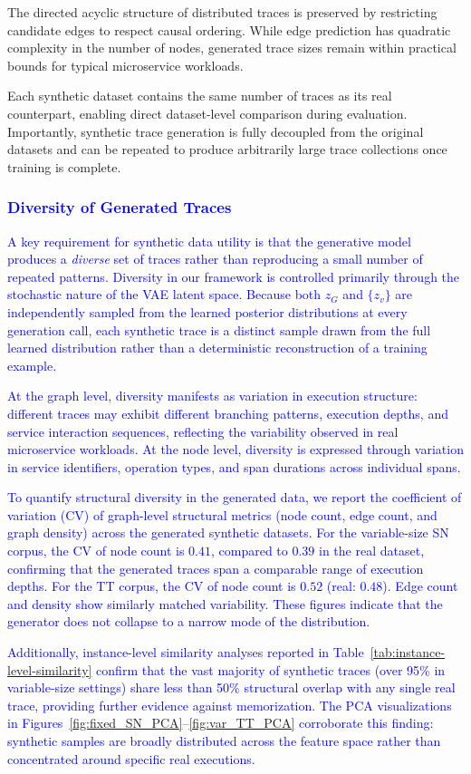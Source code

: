 \documentclass[sigconf,review]{acmart}
\begin{document}
The directed acyclic structure of distributed traces is preserved by restricting candidate edges to respect causal ordering. While edge prediction has quadratic complexity in the number of nodes, generated trace sizes remain within practical bounds for typical microservice workloads.

Each synthetic dataset contains the same number of traces as its real counterpart, enabling direct dataset-level comparison during evaluation. Importantly, synthetic trace generation is fully decoupled from the original datasets and can be repeated to produce arbitrarily large trace collections once training is complete.

\textcolor{blue}{\subsubsection{Diversity of Generated Traces}
A key requirement for synthetic data utility is that the generative model produces a \emph{diverse} set of traces rather than reproducing a small number of repeated patterns. Diversity in our framework is controlled primarily through the stochastic nature of the VAE latent space. Because both $z_G$ and $\{z_v\}$ are independently sampled from the learned posterior distributions at every generation call, each synthetic trace is a distinct sample drawn from the full learned distribution rather than a deterministic reconstruction of a training example.

At the graph level, diversity manifests as variation in execution structure: different traces may exhibit different branching patterns, execution depths, and service interaction sequences, reflecting the variability observed in real microservice workloads. At the node level, diversity is expressed through variation in service identifiers, operation types, and span durations across individual spans.

To quantify structural diversity in the generated data, we report the coefficient of variation (CV) of graph-level structural metrics (node count, edge count, and graph density) across the generated synthetic datasets. For the variable-size SN corpus, the CV of node count is $0.41$, compared to $0.39$ in the real dataset, confirming that the generated traces span a comparable range of execution depths. For the TT corpus, the CV of node count is $0.52$ (real: $0.48$). Edge count and density show similarly matched variability. These figures indicate that the generator does not collapse to a narrow mode of the distribution.

Additionally, instance-level similarity analyses reported in Table~\ref{tab:instance-level-similarity} confirm that the vast majority of synthetic traces (over 95\% in variable-size settings) share less than 50\% structural overlap with any single real trace, providing further evidence against memorization. The PCA visualizations in Figures~\ref{fig:fixed_SN_PCA}--\ref{fig:var_TT_PCA} corroborate this finding: synthetic samples are broadly distributed across the feature space rather than concentrated around specific real executions.}
\end{document}
